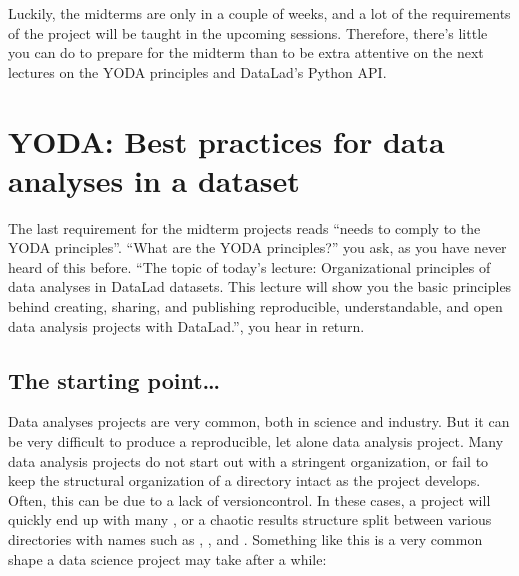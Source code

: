 \sphinxAtStartPar
Luckily, the midterms are only in a couple of weeks, and a lot of the
requirements of the project will be taught in the upcoming sessions.
Therefore, there’s little you can do to prepare for the midterm
than to be extra attentive on the next lectures on the YODA
principles and DataLad’s Python API.

\sphinxstepscope

\ignorespaces 

\section{YODA: Best practices for data analyses in a dataset}
\label{\detokenize{basics/101-127-yoda:yoda-best-practices-for-data-analyses-in-a-dataset}}\label{\detokenize{basics/101-127-yoda:yoda}}\label{\detokenize{basics/101-127-yoda:id1}}\label{\detokenize{basics/101-127-yoda:index-0}}\label{\detokenize{basics/101-127-yoda::doc}}
\sphinxAtStartPar
The last requirement for the midterm projects reads “needs to comply to the
YODA principles”.
“What are the YODA principles?” you ask, as you have never heard of this
before.
“The topic of today’s lecture: Organizational principles of data
analyses in DataLad datasets. This lecture will show you the basic
principles behind creating, sharing, and publishing reproducible,
understandable, and open data analysis projects with DataLad.”, you
hear in return.


\subsection{The starting point…}
\label{\detokenize{basics/101-127-yoda:the-starting-point}}
\sphinxAtStartPar
Data analyses projects are very common, both in science and industry.
But it can be very difficult to produce a reproducible, let alone
 data analysis project.
Many data analysis projects do not start out with
a stringent organization, or fail to keep the structural organization of a
directory intact as the project develops. Often, this can be due to a lack of
version\sphinxhyphen{}control. In these cases, a project will quickly end up
with many
,
or a chaotic results structure split between various directories with names
such as , ,  and
. Something like this is a very
common shape a data science project may take after a while:

